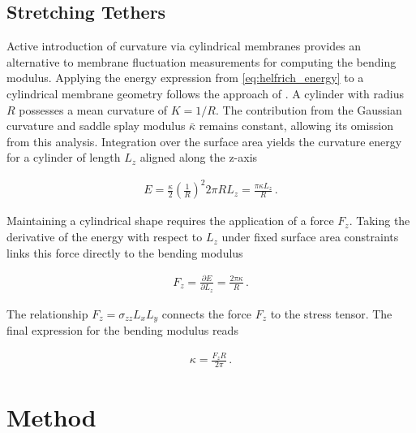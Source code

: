 \documentclass[
    11pt,
    a4paper,
    oneside,        %
    BCOR=10mm,      %
    parskip=half,   %
    listof=nototoc,   %
    bibliography=totoc %
]{scrreprt}
\begin{document}
\section{Stretching Tethers}\label{sec:methods_tethers}

Active introduction of curvature via cylindrical membranes provides an alternative to membrane fluctuation measurements for computing the bending modulus. Applying the energy expression from \cref{eq:helfrich_energy} to a cylindrical membrane geometry follows the approach of \citeauthor{Markus_tethers} \cite{Markus_tethers}. A cylinder with radius $R$ possesses a mean curvature of $K=1/R$. The contribution from the Gaussian curvature and saddle splay modulus $\bar{\kappa}$ remains constant, allowing its omission from this analysis. Integration over the surface area yields the curvature energy for a cylinder of length $L_z$ aligned along the z-axis

\begin{align}
E = \frac{\kappa}{2} \left(\frac{1}{R} \right)^2 2\pi RL_z
= \frac{\pi \kappa L_z}{R}\, .
\end{align}

Maintaining a cylindrical shape requires the application of a force $F_z$. Taking the derivative of the energy with respect to $L_z$ under fixed surface area constraints links this force directly to the bending modulus

\begin{align}
F_z = \frac{\partial E}{\partial L_z} = \frac{2 \pi \kappa}{R}\, .
\end{align}

The relationship $F_z = \sigma_{zz}L_x L_y$ connects the force $F_z$ to the stress tensor. The final expression for the bending modulus reads

\begin{align}
\kappa = \frac{F_z R}{2\pi}\, .\label{eq:tether_central_from}
\end{align}








\chapter{Method}\label{ch:methods}
\end{document}

